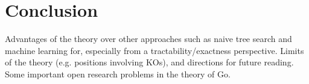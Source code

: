 \documentclass[../math194_paper.tex]{subfiles}
\begin{document}
    
\section{Conclusion}

Advantages of the theory over other approaches such as naive tree search and machine 
learning for, especially from a tractability/exactness perspective. Limits of the
theory (e.g. positions involving KOs), and directions for future reading. 
Some important open research problems in the theory of Go. 
\end{document}
